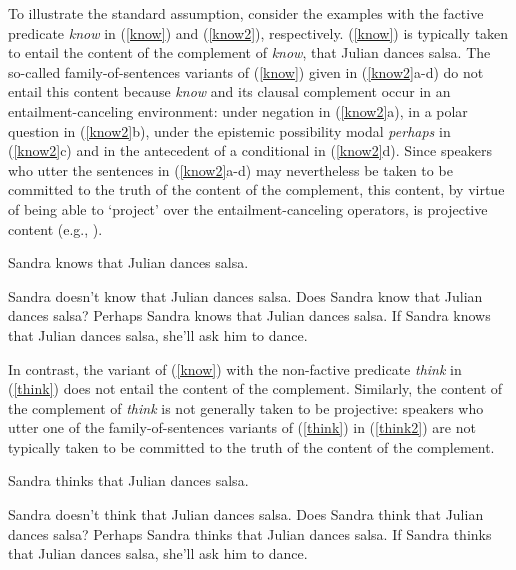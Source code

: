 \documentclass[11pt,fleqn]{article}
\newcommand{\6}{\mbox{$[\hspace*{-.6mm}[$}}
\newcommand{\9}{\mbox{$]\hspace*{-.6mm}]$}}
\begin{document}
To illustrate the standard assumption, consider the examples with the factive predicate {\em know} in  (\ref{know}) and (\ref{know2}), respectively. (\ref{know}) is typically taken to entail the content of the complement of {\em know}, that Julian dances salsa. The so-called family-of-sentences variants of (\ref{know}) given in (\ref{know2}a-d) do not entail this content because {\em know} and its clausal complement occur in an entailment-canceling environment: under negation in (\ref{know2}a), in a polar question in (\ref{know2}b), under the epistemic possibility modal {\em perhaps} in (\ref{know2}c) and in the antecedent of a conditional in (\ref{know2}d). Since speakers who utter the sentences in (\ref{know2}a-d) may nevertheless be taken to be committed to the truth of the content of the complement, this content, by virtue of being able to `project' over the entailment-canceling operators, is projective content (e.g., \citealt{potts05,brst-salt10}). 

\begin{exe}

\ex\label{know} Sandra knows that Julian dances salsa.

\ex\label{know2} 

\begin{xlist} 
\ex Sandra doesn't know that Julian dances salsa. 
\ex Does Sandra know that Julian dances salsa?
\ex Perhaps Sandra knows that Julian dances salsa.
\ex If Sandra knows that Julian dances salsa, she'll ask him to dance. 
\end{xlist}

\end{exe}

In contrast, the variant of (\ref{know}) with the non-factive predicate {\em think} in (\ref{think}) does not entail the content of the complement.  Similarly, the content of the complement of {\em think} is not generally taken to be projective: speakers who utter one of the family-of-sentences variants of (\ref{think}) in (\ref{think2}) are not typically taken to be committed to the truth of the content of the complement. 

\begin{exe}

\ex\label{think} Sandra thinks that Julian dances salsa.
\ex\label{think2} 

\begin{xlist} 
\ex Sandra doesn't think that Julian dances salsa. 
\ex Does Sandra think that Julian dances salsa?
\ex Perhaps Sandra thinks that Julian dances salsa.
\ex If Sandra thinks that Julian dances salsa, she'll ask him to dance. 
\end{xlist}

\end{exe}
\end{document}
